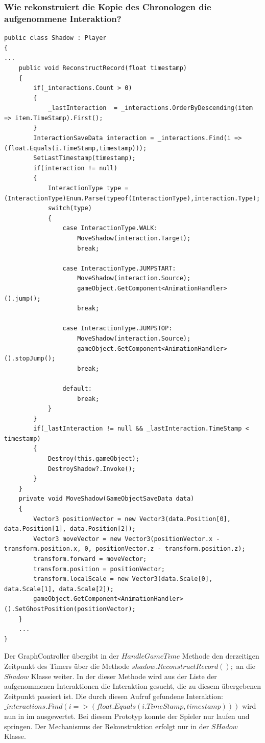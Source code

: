 \subsubsection{Wie rekonstruiert die Kopie des Chronologen die aufgenommene Interaktion?}\label{sec:good_04}
\begin{lstlisting}[caption={Rekonstruktionsmethode aus der Shadow.cs}, label={sec:reconstructing_old}]
public class Shadow : Player
{ 
...
    public void ReconstructRecord(float timestamp)
    {
        if(_interactions.Count > 0)
        {
            _lastInteraction  = _interactions.OrderByDescending(item => item.TimeStamp).First();
        }
        InteractionSaveData interaction = _interactions.Find(i => (float.Equals(i.TimeStamp,timestamp)));
        SetLastTimestamp(timestamp);
        if(interaction != null)
        {
            InteractionType type = (InteractionType)Enum.Parse(typeof(InteractionType),interaction.Type);
            switch(type)
            {
                case InteractionType.WALK:
                    MoveShadow(interaction.Target);
                    break;

                case InteractionType.JUMPSTART:
                    MoveShadow(interaction.Source);
                    gameObject.GetComponent<AnimationHandler>().jump();
                    break;

                case InteractionType.JUMPSTOP:
                    MoveShadow(interaction.Source);
                    gameObject.GetComponent<AnimationHandler>().stopJump();
                    break;

                default:
                    break;
            }
        }
        if(_lastInteraction != null && _lastInteraction.TimeStamp < timestamp)
        {
            Destroy(this.gameObject);
            DestroyShadow?.Invoke();
        }
    }
    private void MoveShadow(GameObjectSaveData data)
    {
        Vector3 positionVector = new Vector3(data.Position[0], data.Position[1], data.Position[2]);
        Vector3 moveVector = new Vector3(positionVector.x - transform.position.x, 0, positionVector.z - transform.position.z);
        transform.forward = moveVector;
        transform.position = positionVector;
        transform.localScale = new Vector3(data.Scale[0], data.Scale[1], data.Scale[2]);
        gameObject.GetComponent<AnimationHandler>().SetGhostPosition(positionVector);
    }
    ...
}
\end{lstlisting}

Der GraphController übergibt in der $HandleGameTime$ Methode den derzeitigen Zeitpunkt des Timers über die Methode $ shadow.ReconstructRecord();$ an die $Shadow$ Klasse weiter. In der dieser Methode wird aus der Liste der aufgenommenen Interaktionen die Interaktion gesucht, die zu diesem übergebenen Zeitpunkt passiert ist. Die durch diesen Aufruf gefundene Interaktion: $\_interactions.Find(i => (float.Equals(i.TimeStamp,timestamp)))$ wird nun in im  ausgewertet. Bei diesem Prototyp konnte der Spieler nur laufen und springen.
Der Mechanismus der Rekonstruktion erfolgt nur in der $SHadow$ Klasse.

